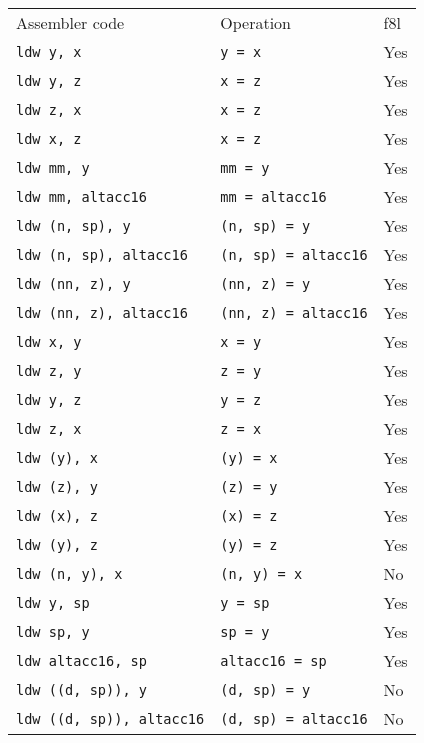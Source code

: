 \documentclass{book}
\begin{document}
\begin{tabular}{l l l}
Assembler code                   & Operation                   & f8l \\
\texttt{ldw y, x}                & \texttt{y = x}              & Yes \\
\texttt{ldw y, z}                & \texttt{x = z}              & Yes \\
\texttt{ldw z, x}                & \texttt{x = z}              & Yes \\
\texttt{ldw x, z}                & \texttt{x = z}              & Yes \\
\texttt{ldw mm, y}               & \texttt{mm = y}             & Yes \\
\texttt{ldw mm, altacc16}        & \texttt{mm = altacc16}      & Yes \\
\texttt{ldw (n, sp), y}          & \texttt{(n, sp) = y}        & Yes \\
\texttt{ldw (n, sp), altacc16}   & \texttt{(n, sp) = altacc16} & Yes \\
\texttt{ldw (nn, z), y}          & \texttt{(nn, z) = y}        & Yes \\
\texttt{ldw (nn, z), altacc16}   & \texttt{(nn, z) = altacc16} & Yes \\
\texttt{ldw x, y}                & \texttt{x = y}              & Yes \\
\texttt{ldw z, y}                & \texttt{z = y}              & Yes \\
\texttt{ldw y, z}                & \texttt{y = z}              & Yes \\
\texttt{ldw z, x}                & \texttt{z = x}              & Yes \\
\texttt{ldw (y), x}              & \texttt{(y) = x}            & Yes \\
\texttt{ldw (z), y}              & \texttt{(z) = y}            & Yes \\
\texttt{ldw (x), z}              & \texttt{(x) = z}            & Yes \\
\texttt{ldw (y), z}              & \texttt{(y) = z}            & Yes \\
\texttt{ldw (n, y), x}           & \texttt{(n, y) = x}         & No \\
\texttt{ldw y, sp}               & \texttt{y = sp}             & Yes \\
\texttt{ldw sp, y}               & \texttt{sp = y}             & Yes \\
\texttt{ldw altacc16, sp}        & \texttt{altacc16 = sp}      & Yes \\
\texttt{ldw ((d, sp)), y}        & \texttt{(d, sp) = y}        & No \\
\texttt{ldw ((d, sp)), altacc16} & \texttt{(d, sp) = altacc16} & No \\
\end{tabular}
\end{document}
